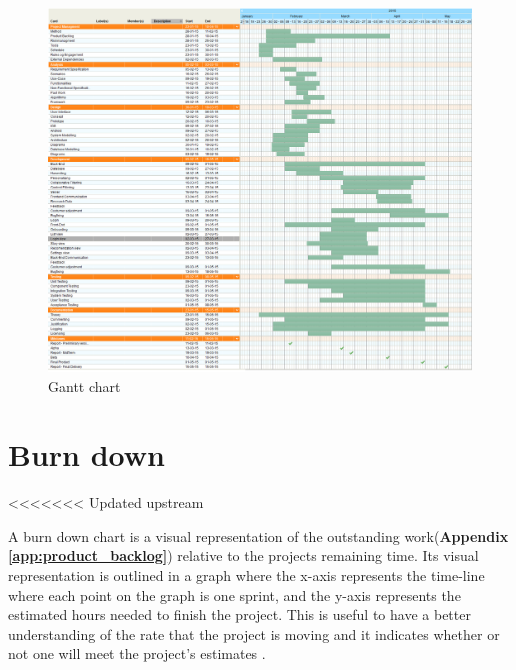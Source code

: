 \begin{figure}[h!]
	\begin{center}
		\advance\leftskip-3cm
		\advance\rightskip-3cm
		\includegraphics[keepaspectratio=true,scale=0.5]{fig/gantt}
		\caption{Gantt chart}
		\label{Fig:gantt}
	\end{center}
\end{figure}

\section{Burn down}

<<<<<<< Updated upstream

A burn down chart is a visual representation of the outstanding work(\textbf{Appendix \ref{app:product_backlog}}) relative to the projects remaining time. Its visual representation is outlined in a graph where the x-axis represents the time-line where each point on the graph is one sprint, and the y-axis represents the estimated hours needed to finish the project\cite{rg3}. This is useful to have a better understanding of the rate that the project is moving and it indicates whether or not one will meet the project's estimates\cite{rg2} \newline.
                                                                                                                                                                                                                      
